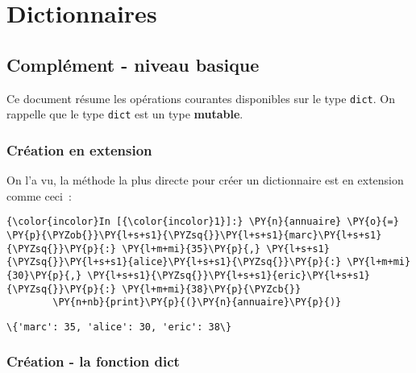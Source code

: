     
    
    
    

    

    \hypertarget{dictionnaires}{%
\section{Dictionnaires}\label{dictionnaires}}

    \hypertarget{compluxe9ment---niveau-basique}{%
\subsection{Complément - niveau
basique}\label{compluxe9ment---niveau-basique}}

    Ce document résume les opérations courantes disponibles sur le type
\texttt{dict}. On rappelle que le type \texttt{dict} est un type
\textbf{mutable}.

    \hypertarget{cruxe9ation-en-extension}{%
\subsubsection{Création en extension}\label{cruxe9ation-en-extension}}

    On l'a vu, la méthode la plus directe pour créer un dictionnaire est en
extension comme ceci~:

    \begin{Verbatim}[commandchars=\\\{\}]
{\color{incolor}In [{\color{incolor}1}]:} \PY{n}{annuaire} \PY{o}{=} \PY{p}{\PYZob{}}\PY{l+s+s1}{\PYZsq{}}\PY{l+s+s1}{marc}\PY{l+s+s1}{\PYZsq{}}\PY{p}{:} \PY{l+m+mi}{35}\PY{p}{,} \PY{l+s+s1}{\PYZsq{}}\PY{l+s+s1}{alice}\PY{l+s+s1}{\PYZsq{}}\PY{p}{:} \PY{l+m+mi}{30}\PY{p}{,} \PY{l+s+s1}{\PYZsq{}}\PY{l+s+s1}{eric}\PY{l+s+s1}{\PYZsq{}}\PY{p}{:} \PY{l+m+mi}{38}\PY{p}{\PYZcb{}}
        \PY{n+nb}{print}\PY{p}{(}\PY{n}{annuaire}\PY{p}{)}
\end{Verbatim}


    \begin{Verbatim}[commandchars=\\\{\}]
\{'marc': 35, 'alice': 30, 'eric': 38\}

    \end{Verbatim}

    \hypertarget{cruxe9ation---la-fonction-dict}{%
\subsubsection{Création - la fonction
dict}\label{cruxe9ation---la-fonction-dict}}

